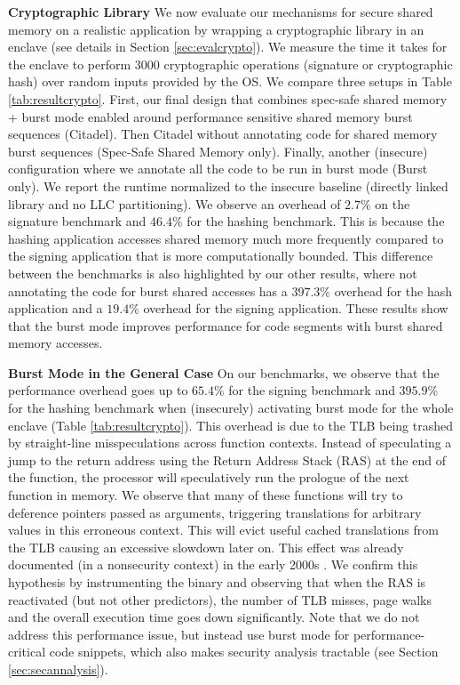 \noindent\textbf{Cryptographic Library}
We now evaluate our mechanisms for secure shared memory on a realistic application by wrapping a cryptographic library in an enclave (see details in Section \ref{sec:evalcrypto}).
We measure the time it takes for the enclave to perform $3000$ cryptographic operations (signature or cryptographic hash) over random inputs provided by the OS.
We compare three setups in Table \ref{tab:resultcrypto}.
First, our final design that combines spec-safe shared memory + burst mode enabled around performance sensitive shared memory burst sequences (Citadel).
Then Citadel without annotating code for shared memory burst sequences (Spec-Safe Shared Memory only).
Finally, another (insecure) configuration where we annotate all the code to be run in burst mode (Burst only).
We report the runtime normalized to the insecure baseline (directly linked library and no LLC partitioning).
We observe an overhead of $2.7\%$ on the signature benchmark and $46.4\%$ for the hashing benchmark.
This is because the hashing application accesses shared memory much more frequently compared to the signing application that is more computationally bounded.
This difference between the benchmarks is also highlighted by our other results, where not annotating the code for burst shared accesses has a $397.3\%$ overhead for the hash application and a $19.4\%$ overhead for the signing application.
These results show that the burst mode improves performance for code segments with burst shared memory accesses.

\noindent\textbf{Burst Mode in the General Case}
On our benchmarks, we observe that the performance overhead goes up to $65.4\%$ for the signing benchmark and $395.9\%$ for the hashing benchmark when (insecurely) activating burst mode for the whole enclave (Table \ref{tab:resultcrypto}). 
This overhead is due to the TLB being trashed by straight-line misspeculations across function contexts.
Instead of speculating a jump to the return address using the Return Address Stack (RAS) at the end of the function, the processor will speculatively run the prologue of the next function in memory.
We observe that many of these functions will try to deference pointers passed as arguments, triggering translations for arbitrary values in this erroneous context.
This will evict useful cached translations from the TLB causing an excessive slowdown later on.
This effect was already documented (in a nonsecurity context) in the early 2000s \cite{onur1,onur2,onur3}.
We confirm this hypothesis by instrumenting the binary and observing that when the RAS is reactivated (but not other predictors), the number of TLB misses, page walks and the overall execution time goes down significantly.
Note that we do not address this performance issue, but instead use burst mode for performance-critical code snippets, which also makes security analysis tractable (see Section \ref{sec:secannalysis}).

